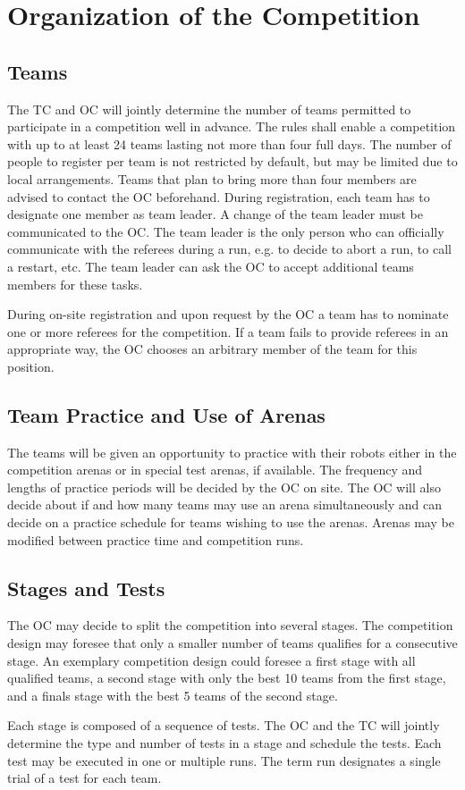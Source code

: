 
\section{Organization of the Competition}\label{sec:organization_of_the_competition}

\subsection{Teams}
The TC and OC will jointly determine the number of teams permitted to participate in a competition well in advance. The rules shall enable a competition with up to at least 24 teams lasting not more than four full days.
The number of people to register per team is not restricted by default, but may be limited due to local arrangements. Teams that plan to bring more than four members are advised to contact the OC beforehand.
During registration, each team has to designate one member as team leader. A change of the team leader must be communicated to the OC. The team leader is the only person who can officially communicate with the referees during a run, e.g. to decide to abort a run, to call a restart, etc. The team leader can ask the OC to accept additional teams members for these tasks.
\par
During on-site registration and upon request by the OC a team has to nominate one or more referees for the competition. If a team fails to provide referees in an appropriate way, the OC chooses an arbitrary member of the team for this position.


\subsection{Team Practice and Use of Arenas}
The teams will be given an opportunity to practice with their robots either in the competition arenas or in special test arenas, if available. The frequency and lengths of practice periods will be decided by the OC on site. The OC will also decide about if and how many teams may use an arena simultaneously and can decide on a practice schedule for teams wishing to use the arenas. Arenas may be modified between practice time and competition runs.

\subsection{Stages and Tests}
The OC may decide to split the competition into several stages. The competition design may foresee that only a smaller number of teams qualifies for a consecutive stage. An exemplary competition design could foresee a first stage with all qualified teams, a second stage with only the best 10 teams from the first stage, and a finals stage with the best 5 teams of the second stage.
\par
Each stage is composed of a sequence of tests. The OC and the TC will jointly determine the type and number of tests in a stage and schedule the tests.
Each test may be executed in one or multiple runs. The term run designates a single trial of a test for each team.

